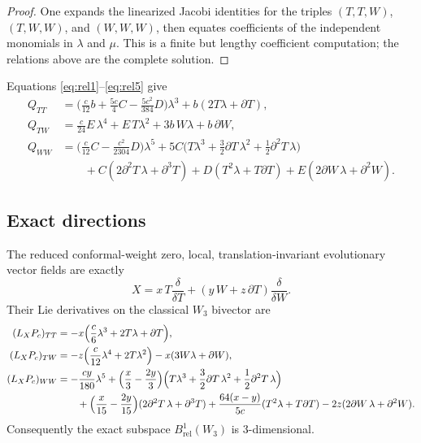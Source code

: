 \begin{proof}
One expands the linearized Jacobi identities for the triples $(T,T,W)$, $(T,W,W)$, and
$(W,W,W)$, then equates coefficients of the independent monomials in $\lambda$ and $\mu$.
This is a finite but lengthy coefficient computation; the relations above are the complete
solution.
\end{proof}

\begin{remark}
Equations \eqref{eq:rel1}--\eqref{eq:rel5} give
\begin{align*}
Q_{TT}
&=
\Big(\frac c{12}b+\frac{5c}{4}C-\frac{5c^2}{384}D\Big)\lambda^3+b(2T\lambda+\partial T),\\[4pt]
Q_{TW}
&=
\frac c{24}E\,\lambda^4+E\,T\lambda^2+3b\,W\lambda+b\,\partial W,\\[4pt]
Q_{WW}
&=
\Big(\frac c{12}C-\frac{c^2}{2304}D\Big)\lambda^5
+5C\Big(T\lambda^3+\frac32\partial T\,\lambda^2+\frac12\partial^2T\,\lambda\Big)\\
&\qquad
+C(2\partial^2T\,\lambda+\partial^3T)
+D(T^2\lambda+T\partial T)
+E(2\partial W\,\lambda+\partial^2W).
\end{align*}
\end{remark}

\subsection{Exact directions}

\begin{proposition}\label{prop:W3exacts}
The reduced conformal-weight zero, local, translation-invariant evolutionary vector fields
are exactly
\[
X=x\,T\frac{\delta}{\delta T}+(y\,W+z\,\partial T)\frac{\delta}{\delta W}.
\]
Their Lie derivatives on the classical $W_3$ bivector are
\begin{align}
(L_XP_c)_{TT}
&=
-x\Big(\frac c6\lambda^3+2T\lambda+\partial T\Big),\label{eq:LXTT}\\
(L_XP_c)_{TW}
&=
-z\Big(\frac c{12}\lambda^4+2T\lambda^2\Big)-x(3W\lambda+\partial W),\label{eq:LXTW}\\
(L_XP_c)_{WW}
&=
-\frac{cy}{180}\lambda^5
+\Big(\frac x3-\frac{2y}{3}\Big)
\Big(T\lambda^3+\frac32\partial T\,\lambda^2+\frac12\partial^2T\,\lambda\Big)\notag\\
&\qquad
+\Big(\frac x{15}-\frac{2y}{15}\Big)(2\partial^2T\,\lambda+\partial^3T)
+\frac{64(x-y)}{5c}(T^2\lambda+T\partial T)
-2z(2\partial W\,\lambda+\partial^2W).\label{eq:LXWW}
\end{align}
Consequently the exact subspace $B^1_{\mathrm{rel}}(W_3)$ is $3$-dimensional.
\end{proposition}

